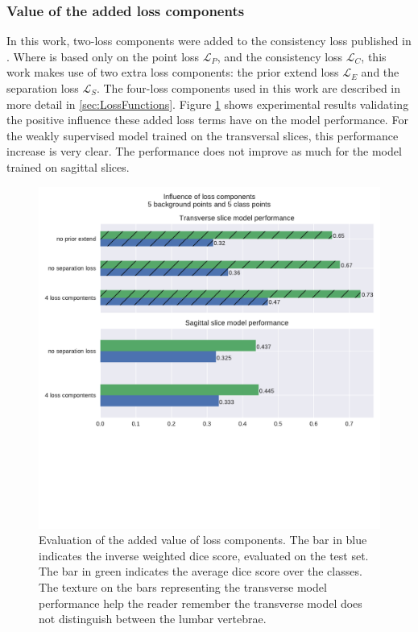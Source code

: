 \subsubsection{Value of the added loss components}
\par{
    In this work, two-loss components were added to the consistency loss published in \cite{Laradji2021}.
    Where \cite{Laradji2021} is based only on the point loss $\mathcal{L}_P$, and the consistency loss $\mathcal{L}_C$, this work makes use of two extra loss components:
    the prior extend loss $\mathcal{L}_E$ and the separation loss $\mathcal{L}_S$. The four-loss components used in this work are described in more detail in \ref{sec:LossFunctions}.
    Figure \ref{fig:addedLossComponents} shows experimental results validating the positive influence these added loss terms have on the model performance.
    For the weakly supervised model trained on the transversal slices, this performance increase is very clear.
    The performance does not improve as much for the model trained on sagittal slices.
}
\begin{figure}
    \centering
    \includegraphics[width=.95\textwidth]{images/Losscomponents.pdf}
    \caption{Evaluation of the added value of loss components. 
    The bar in blue indicates the inverse weighted dice score, evaluated on the test set. The bar in green indicates the average dice score over the classes.
    The texture on the bars representing the transverse model performance help the reader remember the transverse model does not distinguish between the lumbar vertebrae.
    \protect
    \label{fig:addedLossComponents}}
\end{figure}

